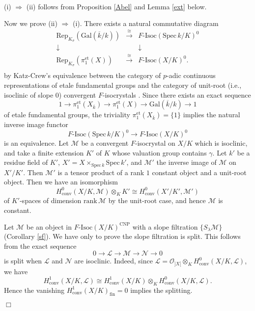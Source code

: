 \documentclass[11pt]{amsart}
\begin{document}
{ {(i) $\Rightarrow$ (ii) follows from Proposition \ref{Abel} and Lemma \ref{ext} below. 

Now we prove (ii) $\Rightarrow$ (i). There exists a natural commutative diagram 
$$
     \begin{array}{ccc}
     \mathrm{Rep}_{K_\sigma}(\mathrm{Gal}(\overline{k}/k)) &\overset{\cong}{\longrightarrow} 
&F\mbox{-}\mathrm{Isoc}(\mathrm{Spec}\, k/K)^0 \\
     \downarrow & &\downarrow \\
     \mathrm{Rep}_{K_\sigma}(\pi_1^{\mathrm{et}}(X)) &\overset{\cong}{\longrightarrow} &F\mbox{-}\mathrm{Isoc}(X/K)^0. \\
\end{array}
$$ 
by Katz-Crew's equivalence between the category of $p$-adic continuous 
representations of etale fundamental groups 
and the category of unit-root (i.e., isoclinic of slope $0$) convergent 
$F$-isocrystals \cite[Theorem 2.1]{Cr}. Since there exists an exact sequence 
$$
      1 \rightarrow \pi_1^{\mathrm{et}}(X_{\overline{k}}) \rightarrow \pi_1^{\mathrm{et}}(X) 
      \rightarrow \mathrm{Gal}(\overline{k}/k) \rightarrow 1 
$$
of etale fundamental groups, the triviality  $\pi_1^{\mathrm{et}}(X_{\overline{k}}) = \{ 1\}$ implies 
the natural inverse image functor 
$$
F\mbox{-}\mathrm{Isoc}(\mathrm{Spec}\, k/K)^0 
\rightarrow F\mbox{-}\mathrm{Isoc}(X/K)^0
$$
is an equivalence. Let $\mathcal M$ be a convergent $F$-isocrystal on $X/K$ 
which is isoclinic, and take a finite extension $K'$ of $K$ 
whose valuation group contains $\gamma$. Let $k'$ be a residue field of $K'$, 
$X' = X \times_{\mathrm{Spec}\, k} \mathrm{Spec}\, k'$, and 
$\mathcal M'$ the inverse image of $\mathcal M$ on $X'/K'$. Then 
$\mathcal M'$ is a tensor product of a rank $1$ constant object and a unit-root object. 
Then we have an isomorphism 
$$
     H_{\mathrm{conv}}^0(X/K, \mathcal M) \otimes_K K' 
     \cong H_{\mathrm{conv}}^0(X'/K', \mathcal M')
$$
of $K'$-spaces of dimension $\mathrm{rank}\, \mathcal M$ by the unit-root case, 
and hence $\mathcal M$ is constant. 

Let $\mathcal M$ be an object in $F\mbox{-}\mathrm{Isoc}(X/K)^{\mathrm{CNP}}$ 
with a slope filtration $\{ S_\lambda\mathcal M\}$ (Corollary \ref{sf}). We have only to prove 
the slope filtration is split. This follows from the exact sequence
$$
     0 \rightarrow \mathcal L \rightarrow \mathcal M \rightarrow \mathcal N \rightarrow 0
$$
is split when $\mathcal L$ and $\mathcal N$ are isoclinic. 
Indeed, since $\mathcal L = \mathcal O_{]X[}\otimes_KH^0_{\mathrm{conv}}(X/K, \mathcal L)$, 
we have 
$$
       H^1_{\mathrm{conv}}(X/K, \mathcal L) \cong 
       H^1_{\mathrm{conv}}(X/K) \otimes_KH^0_{\mathrm{conv}}(X/K, \mathcal L). 
$$
Hence the vanishing $H^1_{\mathrm{conv}}(X/K)_{\mathrm{fin}} = 0$ implies the splitting.} \hspace*{\fill} $\Box$}
\end{document}
